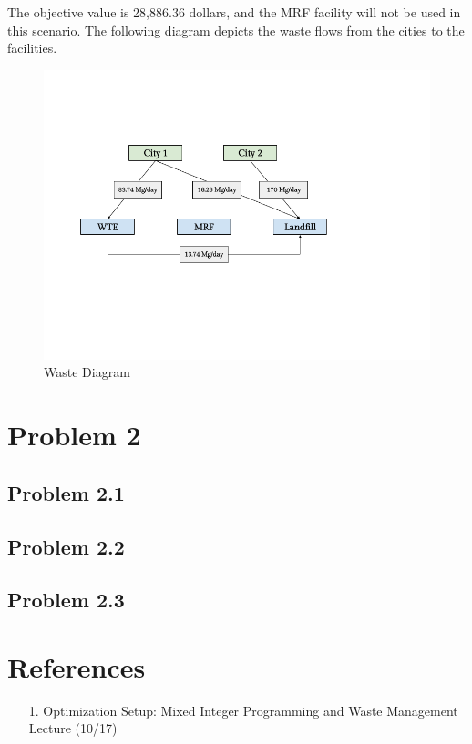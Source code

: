 \documentclass[12pt,a4paper]{article}
\begin{document}
The objective value is 28,886.36 dollars, and the MRF facility will not be used in this scenario.  The following diagram depicts the waste flows from the cities to the facilities. \begin{figure}
\centering
\includegraphics{waste_diagram.png}
\caption{Waste Diagram}
\end{figure}


\section{Problem 2}
\subsection{Problem 2.1}
\subsection{Problem 2.2}
\subsection{Problem 2.3}
\section{References}
\begin{itemize}
\item[1. ] Optimization Setup: Mixed Integer Programming and Waste Management Lecture (10/17)

\end{itemize}
\end{document}
